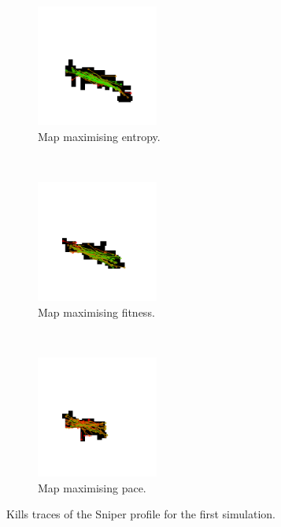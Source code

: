 \begin{figure}[H]
    \centering
    \begin{subfigure}[t]{0.3\textwidth}
        \centering
        \includegraphics[height=4.0cm]{Images/images/experiment_two/best_entropy_pop_0/kill_traces_bot_1.png}
        \caption{Map maximising entropy.}
    \end{subfigure}%
    ~ 
    \begin{subfigure}[t]{0.3\textwidth}
        \centering
        \includegraphics[height=4.0cm]{Images/images/experiment_two/best_fitness_pop_0/kill_traces_bot_1.png}
        \caption{Map maximising fitness.}
    \end{subfigure}
    ~ 
    \begin{subfigure}[t]{0.3\textwidth}
        \centering
        \includegraphics[height=4.0cm]{Images/images/experiment_two/best_pace_pop_0/kill_traces_bot_1.png}
        \caption{Map maximising pace.}
    \end{subfigure}
    \caption{Kills traces of the Sniper profile for the first simulation.}
\end{figure}

\newpage

